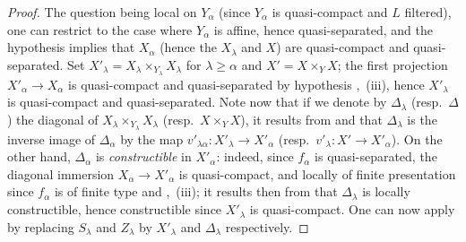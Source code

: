 \begin{proof}
The question being local on $Y_\alpha$ (since $Y_\alpha$ is quasi-compact and $L$ filtered), one can restrict to the case where $Y_\alpha$ is affine, hence quasi-separated, and the hypothesis implies that $X_\alpha$ (hence the $X_\lambda$ and $X$) are quasi-compact and quasi-separated.
Set $X'_\lambda=X_\lambda\times_{Y_\lambda}X_\lambda$ for $\lambda\geqslant\alpha$ and $X'=X\times_Y X$; the first projection $X'_\alpha\to X_\alpha$ is quasi-compact and quasi-separated by hypothesis ,~(iii), hence $X'_\lambda$ is quasi-compact and quasi-separated.
Note now that if we denote by $\Delta_\lambda$ (resp.\ $\Delta$) the diagonal of $X_\lambda\times_{Y_\lambda}X_\lambda$ (resp.\ $X\times_Y X$), it results from  and  that $\Delta_\lambda$ is the inverse image of $\Delta_\alpha$ by the map $v'_{\lambda\alpha}:X'_\lambda\to X'_\alpha$ (resp.\ $v'_\lambda:X'\to X'_\alpha$).
On the other hand, $\Delta_\alpha$ is \emph{constructible} in $X'_\alpha$: indeed, since $f_\alpha$ is quasi-separated, the diagonal immersion $X_\alpha\to X'_\alpha$ is quasi-compact, and locally of finite presentation since $f_\alpha$ is of finite type  and ,~(iii); it results then from  that $\Delta_\lambda$ is locally constructible, hence constructible since $X'_\lambda$ is quasi-compact.
One can now apply  by replacing $S_\lambda$ and $Z_\lambda$ by $X'_\lambda$ and $\Delta_\lambda$ respectively.
\end{proof}

